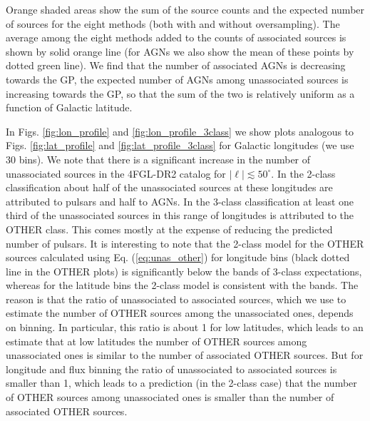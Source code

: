 \documentclass{aa}
\begin{document}
Orange shaded areas show the sum of the source counts and the expected number of sources for the eight methods (both with and without oversampling).
The average among the eight methods added to the counts of associated sources is shown by solid orange line 
(for AGNs we also show the mean of these points by dotted green line).
We find that the number of associated AGNs is decreasing towards the GP, the expected number of AGNs among unassociated sources is increasing towards the GP, so that the sum of the two is relatively uniform as a function of Galactic latitude.


In Figs. \ref{fig:lon_profile} and \ref{fig:lon_profile_3class} we show plots analogous to Figs. \ref{fig:lat_profile} and \ref{fig:lat_profile_3class} for Galactic longitudes (we use 30 bins).
We note that there is a significant increase in the number of unassociated sources in the 4FGL-DR2  catalog for $|\ell | \lesssim 50^\circ$.
In the 2-class classification about half of the unassociated sources at these longitudes are attributed to pulsars and half to AGNs.
In the 3-class classification at least one third of the unassociated sources in this range of longitudes is attributed to the OTHER class.
This comes mostly at the expense of reducing the predicted number of pulsars.
It is interesting to note that the 2-class model for the OTHER sources calculated using Eq. (\ref{eq:unas_other}) for longitude bins
(black dotted line in the OTHER plots) is significantly below the bands of 3-class expectations, whereas for the latitude bins the 2-class model
is consistent with the bands.
The reason is that the ratio of unassociated to associated sources, which we use to estimate the number of OTHER sources among the unassociated ones, depends on binning.
In particular, this ratio is about 1 for low latitudes, which leads to an estimate that at low latitudes the number of OTHER sources among unassociated ones is similar to the number of associated OTHER sources.
But for longitude and flux binning the ratio of unassociated to associated sources is smaller than 1, which leads to a prediction (in the 2-class case) that the number of OTHER sources among unassociated ones is smaller than the number of associated OTHER sources.
\end{document}
